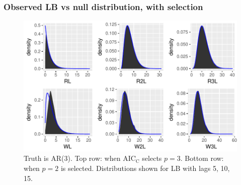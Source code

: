 \documentclass{beamer}
\begin{document}
\begin{frame}
\frametitle{Observed LB vs null distribution, with selection}
\begin{figure}[H]
\begin{center}
\includegraphics[scale=0.6]{true3fit2_selected}
\caption{Truth is AR(3). Top row: when $\mathrm{AIC_C}$ selects $p = 3$. Bottom row: when $p = 2$ is selected. Distributions shown for LB with lags 5, 10, 15.}
\end{center}
\end{figure}
\end{frame}



\end{document}
